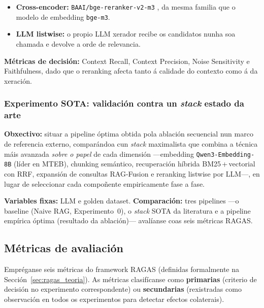 \documentclass[11pt, a4paper, oneside]{report}
\begin{document}
\begin{itemize}
  \item \textbf{Cross-encoder:} \texttt{BAAI/bge-reranker-v2-m3}
    \citep{chen2024m3embedding}, da mesma familia que o modelo de embedding
    \texttt{bge-m3}.
  \item \textbf{LLM listwise:} o propio LLM xerador recibe os candidatos nunha soa
    chamada e devolve a orde de relevancia.
\end{itemize}

\textbf{Métricas de decisión:} Context Recall, Context Precision, Noise Sensitivity e
Faithfulness, dado que o reranking afecta tanto á calidade do contexto como á da
xeración.

\subsubsection{Experimento SOTA: validación contra un \textit{stack} estado da arte}
\label{sec:expsota}

\textbf{Obxectivo:} situar a pipeline óptima obtida pola ablación secuencial nun marco
de referencia externo, comparándoa cun \textit{stack} maximalista que combina a técnica
máis avanzada \emph{sobre o papel} de cada dimensión —embedding \texttt{Qwen3-Embedding-8B}
(líder en MTEB), chunking semántico, recuperación híbrida BM25\,+\,vectorial con \ac{RRF},
expansión de consultas RAG-Fusion e reranking listwise por LLM—, en lugar de seleccionar
cada compoñente empiricamente fase a fase.

\textbf{Variables fixas:} LLM e golden dataset. \textbf{Comparación:} tres pipelines
—o baseline (Naive RAG, Experimento~0), o \textit{stack} SOTA da literatura e a pipeline
empírica óptima (resultado da ablación)— avalíanse coas seis métricas RAGAS.

\subsection{Métricas de avaliación}
\label{sec:metricas}

Empréganse seis métricas do framework RAGAS (definidas formalmente na
Sección~\ref{sec:ragas_teoria}). As métricas clasifícanse como \textbf{primarias}
(criterio de decisión no experimento correspondente) ou \textbf{secundarias}
(rexistradas como observación en todos os experimentos para detectar efectos
colaterais).
\end{document}
